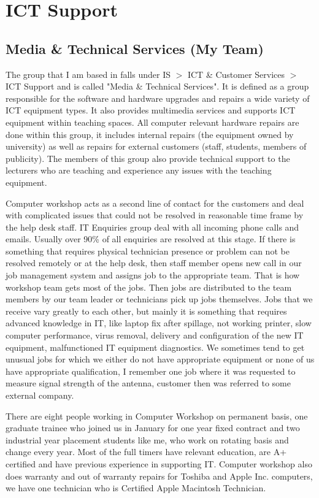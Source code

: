 \documentclass[10pt,a4paper,headinclude=true]{report}
\begin{document}
\section{ICT Support}
\subsection{Media \& Technical Services (My Team)}
The group that I am based in falls under IS $>$ ICT \& Customer Services $>$ ICT Support and is called "Media \& Technical Services". It is defined as a group responsible for the software and hardware upgrades and repairs a wide variety of ICT equipment types. It also provides multimedia services and supports ICT equipment within teaching spaces. All computer relevant hardware repairs are done within this group, it includes internal repairs (the equipment owned by university) as well as repairs for external customers (staff, students, members of publicity). The members of this group also provide technical support to the lecturers who are teaching and experience any issues with the teaching equipment. 

Computer workshop acts as a second line of contact for the customers and deal with complicated issues that could not be resolved in reasonable time frame by the help desk staff. IT Enquiries group deal with all incoming phone calls and emails. Usually over 90\% of all enquiries are resolved at this stage. If there is something that requires physical technician presence or problem can not be resolved remotely or at the help desk, then staff member opens new call in our job management system and assigns job to the appropriate team. That is how workshop team gets most of the jobs. Then jobs are distributed to the team members by our team leader or technicians pick up jobs themselves. Jobs that we receive vary greatly to each other, but mainly it is something that requires advanced knowledge in IT, like laptop fix after spillage, not working printer, slow computer performance, virus removal, delivery and configuration of the new IT equipment, malfunctioned IT equipment diagnostics. We sometimes tend to get unusual jobs for which we either do not have appropriate equipment or none of us have appropriate qualification, I remember one job where it was requested to measure signal strength of the antenna, customer then was referred to some external company.

There are eight people working in Computer Workshop on permanent basis, one graduate trainee who joined us in January for one year fixed contract and two industrial year placement students like me, who work on rotating basis and change every year. Most of the full timers have relevant education, are A+ certified\cite{A+} and have previous experience in supporting IT. Computer workshop also does warranty and out of warranty repairs for Toshiba and Apple Inc. computers, we have one technician who is Certified Apple Macintosh Technician. 
\end{document}
